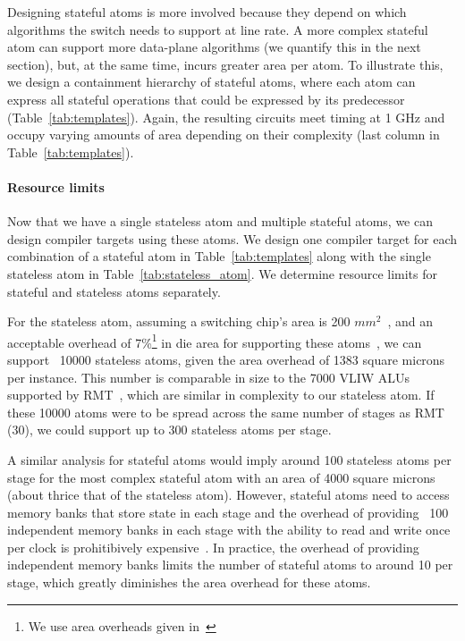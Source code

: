 Designing stateful atoms is more involved because they depend on which
algorithms the switch needs to support at line rate. A more complex stateful
atom can support more data-plane algorithms (we quantify this in the next
section), but, at the same time, incurs greater area per atom. To illustrate
this, we design a containment hierarchy of stateful atoms, where each atom can
express all stateful operations that could be expressed by its predecessor
(Table~\ref{tab:templates}). Again, the resulting circuits meet timing at 1 GHz
and occupy varying amounts of area depending on their complexity (last column
in Table~\ref{tab:templates}).

\paragraph{Resource limits}
Now that we have a single stateless atom and multiple stateful atoms, we can
design compiler targets using these atoms.  We design one compiler target for
each combination of a stateful atom in Table~\ref{tab:templates} along with the
single stateless atom in Table~\ref{tab:stateless_atom}. We determine resource
limits for stateful and stateless atoms separately.

For the stateless atom, assuming a switching chip's area is 200
$mm^2$~\cite{gibb_parsing}, and an acceptable overhead of 7\%\footnote{We use
area overheads given in~\cite{rmt}} in die area for supporting these
atoms~\cite{rmt}, we can support ~10000 stateless atoms, given the area
overhead of 1383 square microns per instance.  This number is comparable in
size to the 7000 VLIW ALUs supported by RMT~\cite{rmt}, which are similar in
complexity to our stateless atom. If these 10000 atoms were to be spread across
the same number of stages as RMT (30), we could support up to 300 stateless atoms
per stage.

A similar analysis for stateful atoms would imply around 100 stateless atoms
per stage for the most complex stateful atom with an area of 4000 square
microns (about thrice that of the stateless atom). However, stateful atoms need
to access memory banks that store state in each stage and the overhead of
providing ~100 independent memory banks in each stage with the ability to read
and write once per clock is prohitibively
expensive~\cite{private_conversations_with_mike}.  In practice, the overhead of
providing independent memory banks limits the number of stateful atoms to
around 10 per stage, which greatly diminishes the area overhead for these
atoms.

